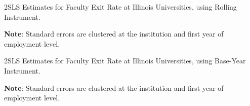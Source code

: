 \documentclass[notitlepage,12pt]{article}
\begin{document}
\begin{table}[H]
    \singlespacing
    \centering
    \caption{2SLS Estimates for Faculty Exit Rate at Illinois Universities, using Rolling Instrument.}
    \makebox[\textwidth][c]{}
    \begin{flushleft}
        \footnotesize
        \textbf{Note}: Standard errors are clustered at the institution and first year of employment level.
    \end{flushleft}
    \label{tab:facultyleaving-shock-illinois-rolling}
\end{table}

\begin{table}[H]
    \singlespacing
    \centering
    \caption{2SLS Estimates for Faculty Exit Rate at Illinois Universities, using Base-Year Instrument.}
    \makebox[\textwidth][c]{}
    \begin{flushleft}
        \footnotesize
        \textbf{Note}: Standard errors are clustered at the institution and first year of employment level.
    \end{flushleft}
    \label{tab:facultyleaving-shock-illinois}
\end{table}
\end{document}
